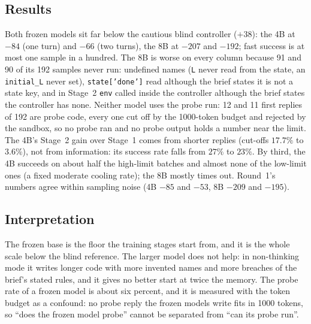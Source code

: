 \documentclass[11pt,a4paper]{article}
\begin{document}
\subsection*{Results}

\begin{center}\small
\resizebox{\linewidth}{!}{}
\end{center}

\begin{center}\small
\resizebox{\linewidth}{!}{}
\end{center}

Both frozen models sit far below the cautious blind controller ($+38$):
the 4B at $-84$ (one turn) and $-66$ (two turns), the 8B at $-207$ and
$-192$; fast success is at most one sample in a hundred. The 8B is worse on
every column because 91 and 90 of its 192 samples never run: undefined names
(\texttt{L} never read from the state, an \texttt{initial\_L} never set),
\texttt{state['done']} read although the brief states it is not a state key,
and in Stage~2 \texttt{env} called inside the controller although the brief
states the controller has none. Neither model uses the probe run: 12 and 11
first replies of 192 are probe code, every one cut off by the 1000-token
budget and rejected by the sandbox, so no probe ran and no probe output holds
a number near the limit. The 4B's Stage~2 gain over Stage~1 comes from
shorter replies (cut-offs $17.7\%$ to $3.6\%$), not from information: its
success rate falls from $27\%$ to $23\%$. By third, the 4B succeeds on about
half the high-limit batches and almost none of the low-limit ones (a fixed
moderate cooling rate); the 8B mostly times out. Round~1's numbers agree
within sampling noise (4B $-85$ and $-53$, 8B $-209$ and $-195$).

\subsection*{Interpretation}

The frozen base is the floor the training stages start from, and it is the
whole scale below the blind reference. The larger model does not help: in
non-thinking mode it writes longer code with more invented names and more
breaches of the brief's stated rules, and it gives no better start at twice
the memory. The probe rate of a frozen model is about six percent, and it is
measured with the token budget as a confound: no probe reply the frozen
models write fits in 1000 tokens, so ``does the frozen model probe'' cannot
be separated from ``can its probe run''.
\end{document}
